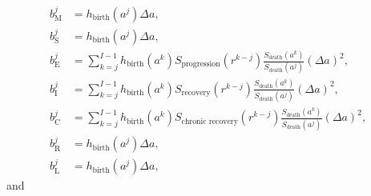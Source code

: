 \documentclass[12pt]{article}
\begin{document}
\begin{subequations}
  \begin{align}
    b_{\mathrm{M}}^j
    &= h_{\text{birth}}(a^j) \Delta a,
    \\
    b_{\mathrm{S}}^j
    &= h_{\text{birth}}(a^j) \Delta a,
    \\
    b_{\mathrm{E}}^j
    &= \sum_{k = j}^{I - 1}
      h_{\text{birth}}(a^k) S_{\text{progression}}(r^{k - j})
      \frac{S_{\text{death}}(a^k)}{S_{\text{death}}(a^j)}
      (\Delta a)^2,
    \\
    b_{\mathrm{I}}^j
    &= \sum_{k = j}^{I - 1}
      h_{\text{birth}}(a^k) S_{\text{recovery}}(r^{k - j})
      \frac{S_{\text{death}}(a^k)}{S_{\text{death}}(a^j)}
      (\Delta a)^2,
    \\
    b_{\mathrm{C}}^j
    &= \sum_{k = j}^{I - 1}
      h_{\text{birth}}(a^k)
      S_{\text{chronic recovery}}(r^{k - j})
      \frac{S_{\text{death}}(a^k)}{S_{\text{death}}(a^j)}
      (\Delta a)^2,
    \\
    b_{\mathrm{R}}^j
    &= h_{\text{birth}}(a^j) \Delta a,
    \\
    b_{\mathrm{L}}^j
    &= h_{\text{birth}}(a^j) \Delta a,
  \end{align}
\end{subequations}
and
\end{document}
